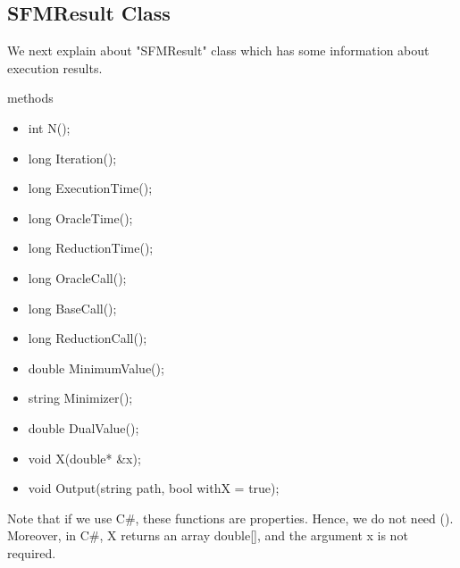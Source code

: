 \documentclass{article}
\begin{document}
\newpage
\subsection{SFMResult Class}
We next explain about "SFMResult" class which has some information about execution results.


\mbox{}

{\sf methods}
\begin{itemize}
\item int N();
\item long Iteration();
\item long ExecutionTime();
\item long OracleTime();
\item long ReductionTime();
\item long OracleCall();
\item long BaseCall();
\item long ReductionCall();
\item double MinimumValue();
\item string Minimizer();
\item double DualValue();
\item void X(double* \&x);
\item void Output(string path, bool withX = true);
\end{itemize}

\mbox{}

Note that if we use C\#,
these functions are properties.
Hence, we do not need ().
Moreover, in C\#, X returns an array double[],
and the argument x is not required.


\mbox{}
\end{document}
